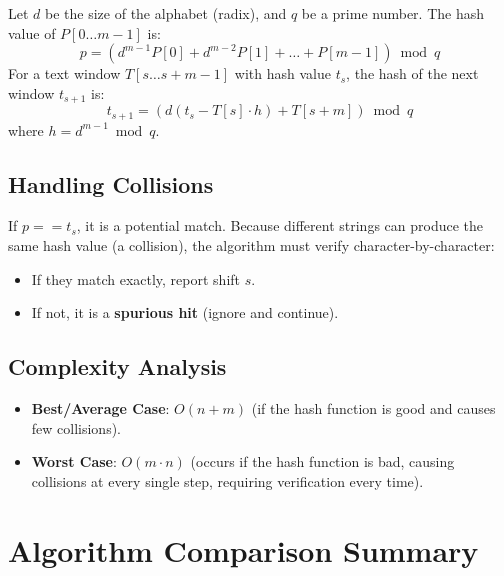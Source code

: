 \documentclass[11pt,a4paper]{article}
\begin{document}
Let $d$ be the size of the alphabet (radix), and $q$ be a prime number.
The hash value of $P[0 \dots m-1]$ is:
\begin{equation}
  p = (d^{m-1}P[0] + d^{m-2}P[1] + \dots + P[m-1]) \bmod q
\end{equation}
For a text window $T[s \dots s+m-1]$ with hash value $t_s$, the hash of the next window $t_{s+1}$ is:
\begin{equation}
  t_{s+1} = \left( d(t_s - T[s] \cdot h) + T[s+m] \right) \bmod q
\end{equation}
where $h = d^{m-1} \bmod q$.

\subsection{Handling Collisions}
If $p == t_s$, it is a potential match. Because different strings can produce the same hash value (a collision), the algorithm must verify character-by-character:
\begin{itemize}
  \item If they match exactly, report shift $s$.
  \item If not, it is a \textbf{spurious hit} (ignore and continue).
\end{itemize}

\subsection{Complexity Analysis}
\begin{itemize}
  \item \textbf{Best/Average Case}: $O(n + m)$ (if the hash function is good and causes few collisions).
  \item \textbf{Worst Case}: $O(m \cdot n)$ (occurs if the hash function is bad, causing collisions at every single step, requiring verification every time).
\end{itemize}

\section{Algorithm Comparison Summary}
\end{document}
